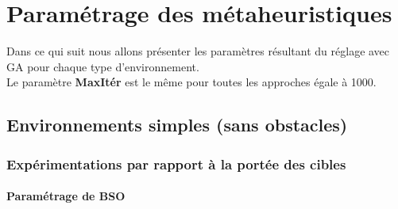
\chapter{Paramétrage des métaheuristiques} %

\label{AppendixB} %
Dans ce qui suit nous allons présenter les paramètres résultant du réglage avec GA pour chaque type d'environnement.\\

Le paramètre \textbf{MaxItér} est le même pour toutes les approches égale à 1000.

\section{Environnements simples (sans obstacles)}
\subsection{Expérimentations par rapport à la portée des cibles}
\subsubsection{Paramétrage de BSO} 

